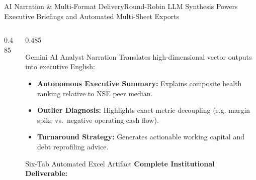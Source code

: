 \begin{frame}{AI Narration \& Multi-Format Delivery}{Round-Robin LLM Synthesis Powers Executive Briefings and Automated Multi-Sheet Exports}
\begin{columns}[T,onlytextwidth]
\begin{column}{0.485\textwidth}
\begin{tcolorbox}
                \vfill
            \end{tcolorbox}
        \end{column}

        \begin{column}{0.485\textwidth}
            \begin{quantcard}[height=2.74cm]{Gemini AI Analyst Narration}
                \fontsize{5.7pt}{6.9pt}\selectfont
                Translates high-dimensional vector outputs into executive English:
                \begin{itemize}
                    \setlength{\itemsep}{0.8pt}
                    \item \textbf{Autonomous Executive Summary:} Explains composite health ranking relative to NSE peer median.
                    \item \textbf{Outlier Diagnosis:} Highlights exact metric decoupling (e.g. margin spike vs.\ negative operating cash flow).
                    \item \textbf{Turnaround Strategy:} Generates actionable working capital and debt reprofiling advice.
                \end{itemize}
            \end{quantcard}

            \vspace{0.12cm}

            \begin{quantcard}[height=2.74cm]{Six-Tab Automated Excel Artifact}
                \fontsize{5.2pt}{6.4pt}\selectfont
                \textbf{\color{deepemerald}Complete Institutional Deliverable:}
                \vspace{2pt}


\end{quantcard}
\end{column}
\end{columns}
\end{frame}
